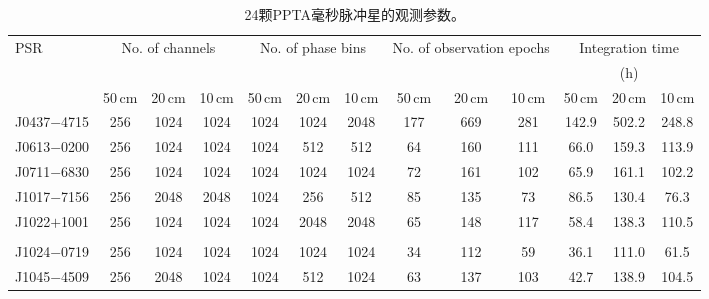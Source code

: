 \begin{landscape}

\begin{table}
\caption{24颗PPTA毫秒脉冲星的观测参数。}
\label{obs}
\begin{center}
\begin{tabular}{lcccccccccccc}
\hline
PSR         &     \multicolumn{3}{c}{No. of channels}   &   \multicolumn{3}{c}{No. of phase bins}  &    \multicolumn{3}{c}{No. of observation epochs}   &    \multicolumn{3}{c}{Integration time}      \\
            &         &                 &          &         &             &          &         &             &          &         &   (h)            &       \\
            & 50\,cm &    20\,cm     & 10\,cm &  50\,cm &    20\,cm     & 10\,cm &  50\,cm &    20\,cm     & 10\,cm &  50\,cm &    20\,cm     & 10\,cm     \\
\hline
J0437$-$4715&  256    &    1024         &   1024   &  1024   &  1024       &  2048    &  177    &  669        & 281      &  142.9  &    502.2         &  248.8   \\
J0613$-$0200&  256    &    1024         &   1024   &  1024   &  512        &  512     &  64     &  160        & 111      &  66.0   &    159.3         &  113.9   \\
J0711$-$6830&  256    &    1024         &   1024   &  1024   &  1024       &  1024    &  72     &  161        & 102      &  65.9   &    161.1         &  102.2   \\
J1017$-$7156&  256    &    2048         &   2048   &  1024   &  256        &  512     &  85     &  135        & 73       &  86.5   &    130.4         &  76.3    \\
J1022$+$1001&  256    &    1024         &   1024   &  1024   &  2048       &  2048    &  65     &  148        & 117      &  58.4   &    138.3         &  110.5    \\
						&         &                 &          &         &             &          &         &             &          &         &                  &           \\
J1024$-$0719&  256    &    1024         &   1024   &  1024   &  1024       &  1024    &  34     &  112        & 59       &  36.1   &    111.0         &  61.5     \\
J1045$-$4509&  256    &    2048         &   1024   &  1024   &  512        &  1024    &  63     &  137        & 103      &  42.7   &    138.9         &  104.5    \\ 

\end{tabular}
\end{center}
\end{table}
\end{landscape}
